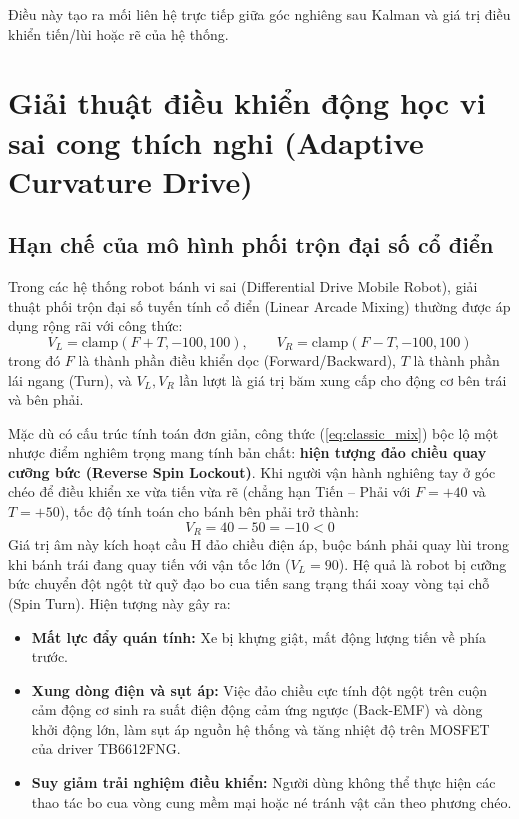 Điều này tạo ra mối liên hệ trực tiếp giữa góc nghiêng sau Kalman và giá trị điều khiển tiến/lùi hoặc rẽ của hệ thống.


\section{Giải thuật điều khiển động học vi sai cong thích nghi (Adaptive Curvature Drive)}
\label{sec:curvature-drive}

\subsection{Hạn chế của mô hình phối trộn đại số cổ điển}

Trong các hệ thống robot bánh vi sai (Differential Drive Mobile Robot), giải thuật phối trộn đại số tuyến tính cổ điển (Linear Arcade Mixing) thường được áp dụng rộng rãi với công thức:
\begin{equation}
V_L = \mathrm{clamp}(F + T, -100, 100), \qquad V_R = \mathrm{clamp}(F - T, -100, 100)
\label{eq:classic_mix}
\end{equation}
trong đó $F$ là thành phần điều khiển dọc (Forward/Backward), $T$ là thành phần lái ngang (Turn), và $V_L, V_R$ lần lượt là giá trị băm xung cấp cho động cơ bên trái và bên phải.

Mặc dù có cấu trúc tính toán đơn giản, công thức (\ref{eq:classic_mix}) bộc lộ một nhược điểm nghiêm trọng mang tính bản chất: \textbf{hiện tượng đảo chiều quay cưỡng bức (Reverse Spin Lockout)}. Khi người vận hành nghiêng tay ở góc chéo để điều khiển xe vừa tiến vừa rẽ (chẳng hạn Tiến -- Phải với $F = +40$ và $T = +50$), tốc độ tính toán cho bánh bên phải trở thành:
\begin{equation}
V_R = 40 - 50 = -10 < 0
\end{equation}
Giá trị âm này kích hoạt cầu H đảo chiều điện áp, buộc bánh phải quay lùi trong khi bánh trái đang quay tiến với vận tốc lớn ($V_L = 90$). Hệ quả là robot bị cưỡng bức chuyển đột ngột từ quỹ đạo bo cua tiến sang trạng thái xoay vòng tại chỗ (Spin Turn). Hiện tượng này gây ra:
\begin{itemize}
    \item \textbf{Mất lực đẩy quán tính:} Xe bị khựng giật, mất động lượng tiến về phía trước.
    \item \textbf{Xung dòng điện và sụt áp:} Việc đảo chiều cực tính đột ngột trên cuộn cảm động cơ sinh ra suất điện động cảm ứng ngược (Back-EMF) và dòng khởi động lớn, làm sụt áp nguồn hệ thống và tăng nhiệt độ trên MOSFET của driver TB6612FNG.
    \item \textbf{Suy giảm trải nghiệm điều khiển:} Người dùng không thể thực hiện các thao tác bo cua vòng cung mềm mại hoặc né tránh vật cản theo phương chéo.
\end{itemize}

